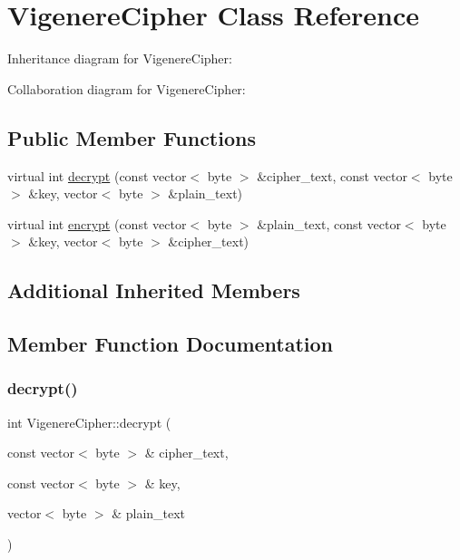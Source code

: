 \hypertarget{classVigenereCipher}{}\section{Vigenere\+Cipher Class Reference}
\label{classVigenereCipher}


Inheritance diagram for Vigenere\+Cipher\+:


Collaboration diagram for Vigenere\+Cipher\+:
\subsection*{Public Member Functions}
\begin{DoxyCompactItemize}
\item 
virtual int \hyperlink{classVigenereCipher_a6eb292617c3a63bed3ee97f48f916522}{decrypt} (const vector$<$ byte $>$ \&cipher\+\_\+text, const vector$<$ byte $>$ \&key, vector$<$ byte $>$ \&plain\+\_\+text)
\item 
virtual int \hyperlink{classVigenereCipher_a3952791f1e39fc4c5280f8fcec4dea43}{encrypt} (const vector$<$ byte $>$ \&plain\+\_\+text, const vector$<$ byte $>$ \&key, vector$<$ byte $>$ \&cipher\+\_\+text)
\end{DoxyCompactItemize}
\subsection*{Additional Inherited Members}


\subsection{Member Function Documentation}
\mbox{\label{classVigenereCipher_a6eb292617c3a63bed3ee97f48f916522}} 
\subsubsection{\texorpdfstring{decrypt()}{decrypt()}}
{\footnotesize\ttfamily int Vigenere\+Cipher\+::decrypt (\begin{DoxyParamCaption}\item[{const vector$<$ byte $>$ \&}]{cipher\+\_\+text,  }\item[{const vector$<$ byte $>$ \&}]{key,  }\item[{vector$<$ byte $>$ \&}]{plain\+\_\+text }\end{DoxyParamCaption})\hspace{0.3cm}{\ttfamily [virtual]}}

